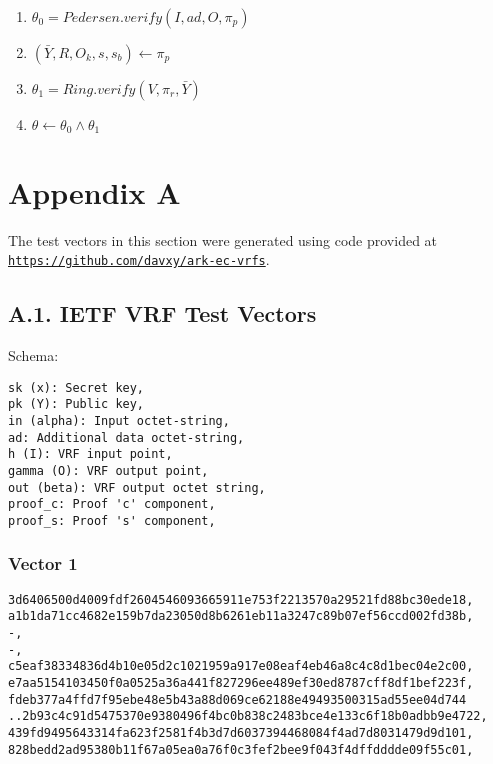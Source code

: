 \documentclass[
]{article}
\providecommand{\tightlist}{%
  \setlength{\itemsep}{0pt}\setlength{\parskip}{0pt}}
\begin{document}
\begin{enumerate}
\def\labelenumi{\arabic{enumi}.}
\tightlist
\item
  \(\theta_0 = Pedersen.verify(I, ad, O, \pi_p)\)
\item
  \((\bar{Y}, R, O_k, s, s_b) \gets \pi_p\)
\item
  \(\theta_1 = Ring.verify(V, \pi_r, \bar{Y})\)
\item
  \(\theta \gets \theta_0 \land \theta_1\)
\end{enumerate}

\hypertarget{appendix-a}{%
\section{Appendix A}\label{appendix-a}}

The test vectors in this section were generated using code provided at
\href{https://github.com/davxy/ark-ec-vrfs}{\texttt{https://github.com/davxy/ark-ec-vrfs}}.

\hypertarget{a.1.-ietf-vrf-test-vectors}{%
\subsection{A.1. IETF VRF Test
Vectors}\label{a.1.-ietf-vrf-test-vectors}}

Schema:

\begin{verbatim}
sk (x): Secret key,
pk (Y): Public key,
in (alpha): Input octet-string,
ad: Additional data octet-string,
h (I): VRF input point,
gamma (O): VRF output point,
out (beta): VRF output octet string,
proof_c: Proof 'c' component,
proof_s: Proof 's' component,
\end{verbatim}

\hypertarget{vector-1}{%
\subsubsection{Vector 1}\label{vector-1}}

\begin{verbatim}
3d6406500d4009fdf2604546093665911e753f2213570a29521fd88bc30ede18,
a1b1da71cc4682e159b7da23050d8b6261eb11a3247c89b07ef56ccd002fd38b,
-,
-,
c5eaf38334836d4b10e05d2c1021959a917e08eaf4eb46a8c4c8d1bec04e2c00,
e7aa5154103450f0a0525a36a441f827296ee489ef30ed8787cff8df1bef223f,
fdeb377a4ffd7f95ebe48e5b43a88d069ce62188e49493500315ad55ee04d744
..2b93c4c91d5475370e9380496f4bc0b838c2483bce4e133c6f18b0adbb9e4722,
439fd9495643314fa623f2581f4b3d7d6037394468084f4ad7d8031479d9d101,
828bedd2ad95380b11f67a05ea0a76f0c3fef2bee9f043f4dffdddde09f55c01,
\end{verbatim}
\end{document}
